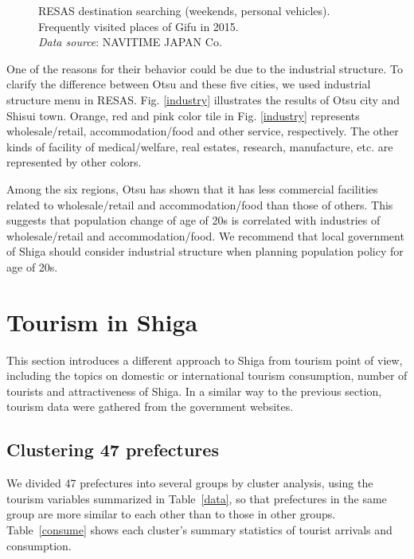 \documentclass[10pt, conference, compsocconf]{IEEEtran}
\begin{document}
\begin{figure}[!t]
\centering
\begin{center}
\caption{RESAS destination searching (weekends, personal vehicles). Frequently visited places of Gifu in 2015.
\\{\it Data source}: NAVITIME JAPAN Co.
}\label{gifu1}
\end{center}
\end{figure}

One of the reasons for their behavior could be due to the industrial structure. 
To clarify the difference between Otsu and these five cities, we used industrial structure menu in RESAS.
Fig. \ref{industry} illustrates the results of Otsu city and Shisui town.
Orange, red and pink color tile in Fig. \ref{industry} represents wholesale/retail, accommodation/food and other service, respectively. The other kinds of facility of medical/welfare, real estates, research, manufacture, etc. are represented by other colors.

Among the six regions, Otsu has shown that it has less commercial facilities related to wholesale/retail and accommodation/food than those of others. This suggests that population change of age of 20s is correlated with industries of wholesale/retail and accommodation/food. We recommend that local government of Shiga should consider industrial structure when planning population policy for age of 20s.

\section{Tourism in Shiga}\label{sec:tour}
This section introduces a different approach to Shiga from tourism point of view, including the topics on domestic or international tourism consumption, number of tourists and attractiveness of Shiga. 
In a similar way to the previous section, tourism data were gathered from the government websites. 

\subsection{Clustering 47 prefectures}\label{clus}


We divided 47 prefectures into several groups by cluster analysis, using the tourism variables summarized in Table~\ref{data}, so that prefectures in the same group are more similar to each other than to those in other groups.
Table~\ref{consume} shows each cluster's summary statistics of tourist arrivals and consumption. 
\end{document}
